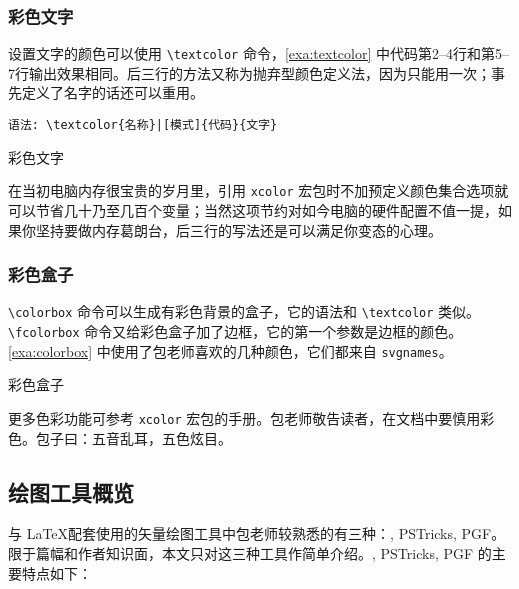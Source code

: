 \subsubsection{彩色文字}

设置文字的颜色可以使用 \verb|\textcolor| 命令，\autoref{exa:textcolor} 中代码第2--4行和第5--7行输出效果相同。后三行的方法又称为抛弃型颜色定义法，因为只能用一次；事先定义了名字的话还可以重用。

\verb+语法: \textcolor{名称}|[模式]{代码}{文字}+

\begin{example}[h]
\caption{彩色文字}
\label{exa:textcolor}
\end{example}

在当初电脑内存很宝贵的岁月里，引用 \texttt{xcolor} 宏包时不加预定义颜色集合选项就可以节省几十乃至几百个变量；当然这项节约对如今电脑的硬件配置不值一提，如果你坚持要做内存葛朗台，后三行的写法还是可以满足你变态的心理。

\subsubsection{彩色盒子}

\verb|\colorbox| 命令可以生成有彩色背景的盒子，它的语法和 \verb|\textcolor| 类似。\verb|\fcolorbox| 命令又给彩色盒子加了边框，它的第一个参数是边框的颜色。\autoref{exa:colorbox} 中使用了包老师喜欢的几种颜色，它们都来自 \texttt{svgnames}。

\begin{example}[h]
\begin{BTDemo}[numbers=left]
\colorbox{Lavender}{}
\colorbox{SkyBlue}{}
\colorbox{Wheat}{}
\end{BTDemo}
\caption{彩色盒子}
\label{exa:colorbox}
\end{example}

更多色彩功能可参考 \texttt{xcolor} 宏包的手册\citep{Kern_xcolor}。包老师敬告读者，在文档中要慎用彩色。包子曰：五音乱耳，五色炫目。

\subsection{绘图工具概览}
\label{sec:graph_tools}

与 \LaTeX 配套使用的矢量绘图工具中包老师较熟悉的有三种：\MP, PSTricks, PGF。限于篇幅和作者知识面，本文只对这三种工具作简单介绍。\MP, PSTricks, PGF 的主要特点如下：

